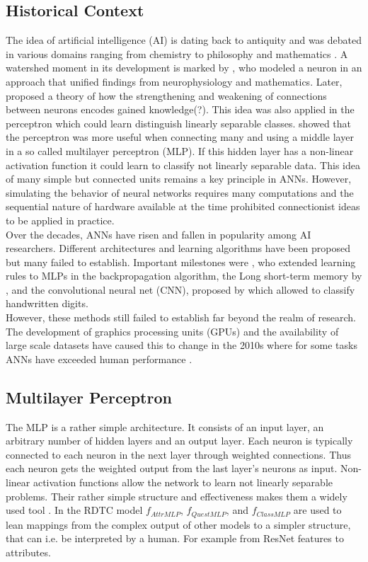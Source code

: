 \documentclass[a4paper,cleardoubleempty,BCOR1cm, 11pt]{report}
\begin{document}
\subsection{Historical Context}
The idea of artificial intelligence (AI) is dating back to antiquity and was debated in various domains ranging from chemistry \cite{o1994alchemical} to philosophy and mathematics \cite{leibnizdissertatio}. A watershed moment in its development is marked by \citet{mcculloch1943logical}, who modeled a neuron in an approach that unified findings from neurophysiology and mathematics. Later, \citet{hebb19680} proposed a theory of how the strengthening and weakening of connections between neurons encodes gained knowledge(?).  This idea was also applied in the perceptron \cite{rosenblatt1960perceptron} which could learn distinguish linearly separable classes. 
\citet{marvin1969perceptrons} showed that the perceptron was more useful when connecting many and using a middle layer in a so called multilayer perceptron (MLP). If this hidden layer has a non-linear activation function it could learn to classify not linearly separable data. This idea of many simple but connected units remains a key principle in ANNs.
However, simulating the behavior of neural networks requires many computations and the sequential nature of hardware available at the time prohibited connectionist ideas to be applied in practice.\\
Over the decades, ANNs have risen and fallen in popularity among AI researchers. Different architectures and learning algorithms have been proposed but many failed to establish. Important milestones were \citet{rumelhart1986learning}, who extended learning rules to MLPs in the backpropagation algorithm, the Long short-term memory by \citet{hochreiter1997long}, and the convolutional neural net (CNN), proposed by \citet{lecun1995convolutional} which allowed to classify handwritten digits.\\
However, these methods still failed to establish far beyond the realm of research. The development of graphics processing units (GPUs) and the availability of large scale datasets have caused this to change in the 2010s where for some tasks ANNs have exceeded human performance \cite{ILSVRC15}.


\subsection{Multilayer Perceptron}\label{sec:MLP}
The MLP is a rather simple architecture. It consists of an input layer, an arbitrary number of hidden layers and an output layer. Each neuron is typically connected to each neuron in the next layer through weighted connections. Thus each neuron gets the weighted output from the last layer's neurons as input. Non-linear activation functions allow the network to learn not linearly separable problems. Their rather simple structure and effectiveness makes them a widely used tool \cite{beale1990neural}. In the RDTC model $f_{AttrMLP}$, $f_{QuestMLP}$, and $f_{ClassMLP}$ are used to lean mappings from the complex output of other models to a simpler structure, that can i.e. be interpreted by a human. For example from ResNet features to attributes.
\end{document}
